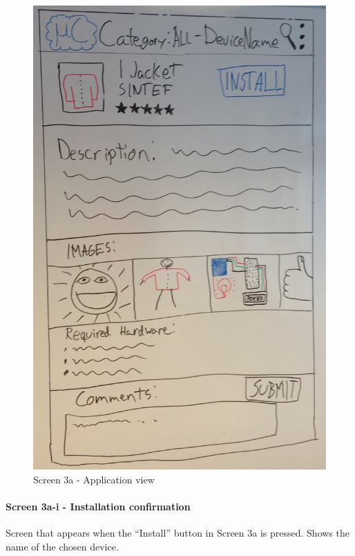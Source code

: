 \begin{figure}[H]
\centering
\includegraphics[scale=0.2]{images/Design_guide/Screen3a.png}
\caption{Screen 3a - Application view}
\label{fig:screen3a}
\end{figure}


\paragraph{Screen 3a-i - Installation confirmation}
Screen that appears when the ``Install'' button in Screen 3a is pressed. Shows the name of the chosen device.

